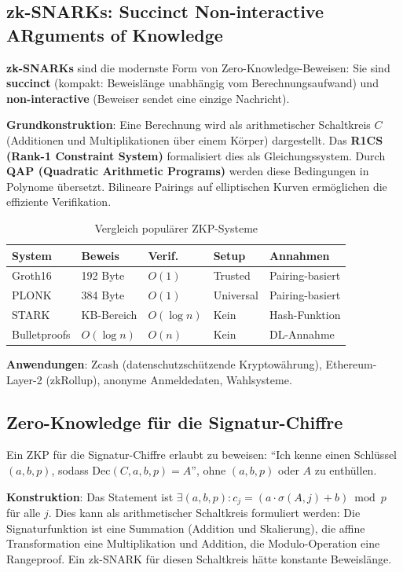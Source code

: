﻿\documentclass[a4paper,12pt]{scrreprt}
\theoremstyle{definition}
\begin{document}
\subsection{zk-SNARKs: Succinct Non-interactive ARguments of Knowledge}

\textbf{zk-SNARKs} \cite{GGPR13} sind die modernste Form von Zero-Knowledge-Beweisen: Sie sind \textbf{succinct} (kompakt: Beweislänge unabhängig vom Berechnungsaufwand) und \textbf{non-interactive} (Beweiser sendet eine einzige Nachricht).

\textbf{Grundkonstruktion}: Eine Berechnung wird als arithmetischer Schaltkreis $C$ (Additionen und Multiplikationen über einem Körper) dargestellt. Das \textbf{R1CS (Rank-1 Constraint System)} formalisiert dies als Gleichungssystem. Durch \textbf{QAP (Quadratic Arithmetic Programs)} \cite{GGPR13} werden diese Bedingungen in Polynome übersetzt. Bilineare Pairings auf elliptischen Kurven ermöglichen die effiziente Verifikation.

\begin{table}[ht]
\centering
\caption{Vergleich populärer ZKP-Systeme}
\begin{tabular}{@{}lllll@{}}
\toprule
\textbf{System} & \textbf{Beweis} & \textbf{Verif.} & \textbf{Setup} & \textbf{Annahmen} \\
\midrule
Groth16 & 192 Byte & $O(1)$ & Trusted & Pairing-basiert \\
PLONK & 384 Byte & $O(1)$ & Universal & Pairing-basiert \\
STARK & KB-Bereich & $O(\log n)$ & Kein & Hash-Funktion \\
Bulletproofs & $O(\log n)$ & $O(n)$ & Kein & DL-Annahme \\
\bottomrule
\end{tabular}
\end{table}

\textbf{Anwendungen}: Zcash (datenschutzschützende Kryptowährung), Ethereum-Layer-2 (zkRollup), anonyme Anmeldedaten, Wahlsysteme.

\subsection{Zero-Knowledge für die Signatur-Chiffre}

Ein ZKP für die Signatur-Chiffre erlaubt zu beweisen: ``Ich kenne einen Schlüssel $(a,b,p)$, sodass $\mathrm{Dec}(C, a,b,p) = A$'', ohne $(a,b,p)$ oder $A$ zu enthüllen.

\textbf{Konstruktion}: Das Statement ist $\exists (a,b,p) : c_j = (a \cdot \sigma(A,j) + b) \bmod p$ für alle $j$. Dies kann als arithmetischer Schaltkreis formuliert werden: Die Signaturfunktion ist eine Summation (Addition und Skalierung), die affine Transformation eine Multiplikation und Addition, die Modulo-Operation eine Rangeproof. Ein zk-SNARK \cite{GGPR13} für diesen Schaltkreis hätte konstante Beweislänge.
\end{document}
